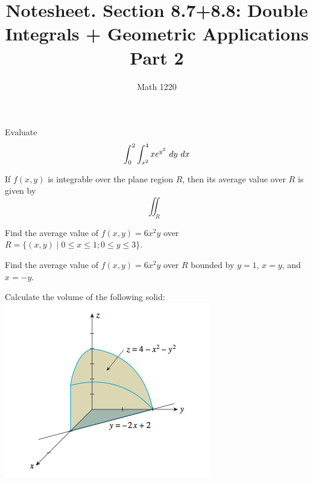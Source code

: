 \documentclass[12pt, a4paper]{article}
\author{Math 1220}
\title{Notesheet. Section 8.7+8.8: Double Integrals + Geometric
  Applications Part 2}
\date{}
\begin{document}
\maketitle
\nameline
\begin{ex}
  Evaluate \[
    \int_0^2 \int_{x^2}^4 x e^{y^2}\ dy \ d x
  \]
\end{ex}
\begin{thrm}
  If \(f(x,y)\) is integrable over the plane region \(R\), then its
  average value over \(R\) is given by \[
    \iint_R
  \]
\end{thrm}
\begin{ex}
  Find the average value of \(f(x,y) = 6x^2y\) over \(R = \{(x,y) \mid
  0 \leq x \leq 1; 0 \leq y \leq 3\}\). 
\end{ex}
\pagebreak
\begin{ex}
  Find the average value of \(f(x,y) = 6x^2 y\) over \(R\) bounded by
  \(y=1\), \(x=y\), and \(x=-y\).
\end{ex}
\begin{ex}
  Calculate the volume of the following solid:\\
  \includegraphics[scale=0.7]{images/solid-for-volume-calc}
\end{ex}
\end{document}
